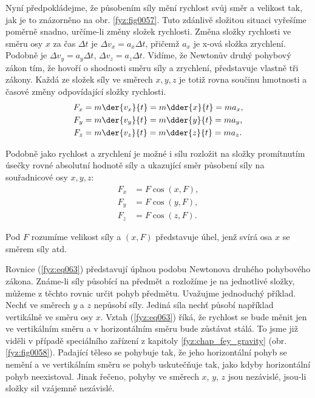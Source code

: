     Nyní předpokládejme, že působením síly mění rychlost svůj směr a velikost tak, jak je to 
    znázorněno na obr. \ref{fyz:fig0057}. Tuto zdánlivě složitou situaci vyřešíme poměrně snadno, 
    určíme-li změny složek rychlosti. Změna složky rychlosti ve směru osy \(x\) za čas \(\Delta t\) 
    je \(\Delta v_x = a_x\Delta t\), přičemž \(a_x\) je x-ová složka zrychlení. Podobně je \(\Delta 
    v_y = a_y\Delta t\), \(\Delta v_z = a_z\Delta t\). Vidíme, že Newtonův druhý pohybový 
    zákon tím, že hovoří o shodnosti směru síly a zrychlení, představuje vlastně tři zákony. Každá 
    ze složek síly ve směrech \(x, y, z\) je totiž rovna součinu hmotnosti a časové změny 
    odpovídající složky rychlosti.
    \begin{subequations}\label{fyz:eq063}
      \begin{align}
        F_x &= m\der{v_x}{t} = m\dder{x}{t} = ma_x, \\
        F_y &= m\der{v_y}{t} = m\dder{y}{t} = ma_y, \\
        F_z &= m\der{v_z}{t} = m\dder{z}{t} = ma_z. 
      \end{align}
    \end{subequations}
    
    Podobně jako rychlost a zrychlení je možné i sílu rozložit na složky promítnutím úsečky rovné 
    absolutní hodnotě síly a ukazující směr působení síly na souřadnicové osy \(x, y, z\):
    \begin{subequations}\label{fyz:eq064}
      \begin{align}
        F_x &= F\cos(x,F),\\
        F_y &= F\cos(y,F),\\
        F_z &= F\cos(z,F).
      \end{align}
    \end{subequations}

    Pod \(F\) rozumíme velikost síly a \((x, F)\) představuje úhel, jenž svírá osa \(x\) se směrem 
    síly atd.
    
    Rovnice (\ref{fyz:eq063}) představují úplnou podobu Newtonova druhého pohybového zákona. 
    Známe-li síly působící na předmět a rozložíme je na jednotlivé složky, můžeme z těchto rovnic 
    určit pohyb předmětu. Uvažujme jednoduchý příklad. Nechť ve směrech \(y\) a \(z\) nepůsobí 
    síly. Jediná síla nechť působí například vertikálně ve směru osy \(x\). Vztah (\ref{fyz:eq063}) 
    říká, že rychlost se bude měnit jen ve vertikálním směru a v horizontálním směru bude zůstávat 
    stálá. To jsme již viděli v případě speciálního zařízení z kapitoly \ref{fyz:chap_fey_gravity} 
    (obr. \ref{fyz:fig0058}). Padající těleso se pohybuje tak, že jeho horizontální pohyb se nemění 
    a ve vertikálním směru se pohyb uskutečňuje tak, jako kdyby horizontální pohyb neexistoval. 
    Jinak řečeno, pohyby ve směrech \(x\), \(y\), \(z\) jsou nezávislé, jsou-li složky sil vzájemně 
    nezávislé.
    
